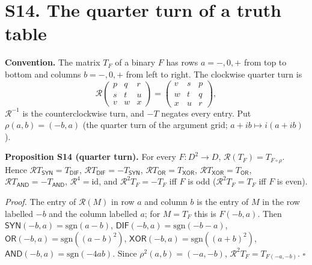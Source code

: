 \documentclass[10pt,a4paper]{article}
\newcommand{\D}{D}\newcommand{\Z}{\mathcal Z}\newcommand{\SYN}{\mathsf{SYN}}\newcommand{\DIF}{\mathsf{DIF}}\newcommand{\OR}{\mathsf{OR}}\newcommand{\XOR}{\mathsf{XOR}}\newcommand{\AND}{\mathsf{AND}}\newcommand{\NOT}{\mathsf{NOT}}\newcommand{\ANT}{\mathsf{ANT}}\newcommand{\MAX}{\mathsf{MAX}}\newcommand{\MIN}{\mathsf{MIN}}\newcommand{\MAG}{\mathsf{MAG}}\newcommand{\chai}{Chai}\newcommand{\Fone}{\mathcal F_1}\newcommand{\Ftwo}{\mathcal F_2}\usepackage{tikz}\usetikzlibrary{arrows.meta,positioning}\newcommand{\yang}{\rule{0.8em}{0.18ex}}\newcommand{\yin}{\rule{0.25em}{0.18ex}\hspace{0.3em}\rule{0.25em}{0.18ex}}\newcommand{\tri}[3]{\raisebox{-0.01ex}{\shortstack[c]{#1\\[-0.3ex]#2\\[-0.3ex]#3}}}\newcommand{\iv}[1]{[\![#1]\!]}
\begin{document}
\section*{S14. The quarter turn of a truth table}
\textbf{Convention.} The matrix $T_F$ of a binary $F$ has rows $a=-,0,+$ from top to bottom and columns $b=-,0,+$ from left to right. The clockwise quarter turn is
\[\mathcal R\begin{pmatrix}p&q&r\\s&t&u\\v&w&x\end{pmatrix}=\begin{pmatrix}v&s&p\\w&t&q\\x&u&r\end{pmatrix},\]
$\mathcal R^{-1}$ is the counterclockwise turn, and $-T$ negates every entry. Put $\rho(a,b)=(-b,a)$ (the quarter turn of the argument grid; $a+ib\mapsto i(a+ib)$).

\textbf{Proposition S14 (quarter turn).} For every $F:\D^2\to\D$, $\mathcal R(T_F)=T_{F\circ\rho}$. Hence $\mathcal RT_{\mathsf{SYN}}=T_{\mathsf{DIF}}$, $\mathcal RT_{\mathsf{DIF}}=-T_{\mathsf{SYN}}$, $\mathcal RT_{\mathsf{OR}}=T_{\mathsf{XOR}}$, $\mathcal RT_{\mathsf{XOR}}=T_{\mathsf{OR}}$, $\mathcal RT_{\mathsf{AND}}=-T_{\mathsf{AND}}$, $\mathcal R^4=\mathrm{id}$, and $\mathcal R^2T_F=-T_F$ iff $F$ is odd ($\mathcal R^2T_F=T_F$ iff $F$ is even).

\emph{Proof.} The entry of $\mathcal R(M)$ in row $a$ and column $b$ is the entry of $M$ in the row labelled $-b$ and the column labelled $a$; for $M=T_F$ this is $F(-b,a)$. Then $\mathsf{SYN}(-b,a)=\mathrm{sgn}(a-b)$, $\mathsf{DIF}(-b,a)=\mathrm{sgn}(-b-a)$, $\mathsf{OR}(-b,a)=\mathrm{sgn}((a-b)^2)$, $\mathsf{XOR}(-b,a)=\mathrm{sgn}((a+b)^2)$, $\mathsf{AND}(-b,a)=\mathrm{sgn}(-4ab)$. Since $\rho^2(a,b)=(-a,-b)$, $\mathcal R^2T_F=T_{F(-a,-b)}$. \hfill$\square$
\end{document}
